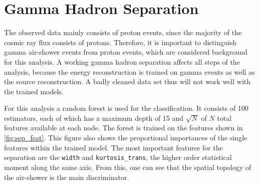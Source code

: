 \section{Gamma Hadron Separation}
%
The observed data mainly consists of proton events, since the majority of the
cosmic ray flux consists of protons. Therefore, it is important to distinguish
gamma air-shower events from proton events, which are considered background for
this analysis. A working gamma hadron separation affects all steps of the
analysis, because the energy reconstruction is trained on gamma events as well
as the source reconstruction. A badly cleaned data set thus will not work well
with the trained models.

For this analysis a random forest is used for the classification. It consists
of \num{100} estimators, each of which has a maximum depth of \num{15} and $\sqrt{N}$ of $N$ total features available at each node. The forest is trained on the features shown in \autoref{fig:sep_feat}.
This figure also shows the proportional importances of the single features
within the trained model. The most important features for the separation are
the \texttt{width} and \texttt{kurtosis\_trans}, the higher order statistical
moment along the same axis. From this, one can see that the spatial topology of
the air-shower is the main discriminator.


